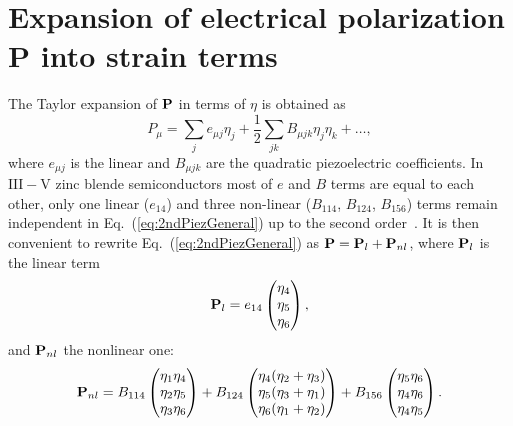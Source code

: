 
\newpage 





\section{Expansion of electrical polarization $\mathbf{P}$ into strain terms}

The Taylor expansion of ${\bf P}$ in terms of $\eta$ is obtained as
%
\begin{equation}
\label{eq:2ndPiezGeneral}
P_{\mu}=\sum_je_{\mu j}\eta_j+\frac{1}{2}\sum_{jk}B_{\mu jk}\eta_j\eta_k+\dots,
\end{equation}
%
where $e_{\mu j}$ is the linear and $B_{\mu jk}$ are the quadratic piezoelectric coefficients. In $\mathrm{III-V}$ zinc blende semiconductors most of $e$ and $B$ terms are equal to each other, only one linear ($e_{14}$) and three non-linear ($B_{114}$, $B_{124}$, $B_{156}$) terms remain independent in Eq.~(\ref{eq:2ndPiezGeneral}) up to the second order~\cite{Beya-Wakata2011}. It is then convenient to rewrite Eq.~(\ref{eq:2ndPiezGeneral}) as ${\bf P}={\bf P}_{l}+{\bf P}_{nl}$, where ${\bf P}_{l}$ is the linear term
%
%
\begin{equation}
\label{eq:1stPiez}
{\bf P}_{l}=e_{14}\begin{pmatrix}\eta_4\\\eta_5\\\eta_6\end{pmatrix},
\end{equation}
%
and ${\bf P}_{nl}$ the nonlinear one:
%
\begin{equation}
\label{eq:2ndPiez}
{\bf P}_{nl}=B_{114}\begin{pmatrix}\eta_1\eta_4\\\eta_2\eta_5\\\eta_3\eta_6\end{pmatrix}+
B_{124}\begin{pmatrix}\eta_4(\eta_2+\eta_3)\\\eta_5(\eta_3+\eta_1)\\\eta_6(\eta_1+\eta_2)\end{pmatrix}+
B_{156}\begin{pmatrix}\eta_5\eta_6\\\eta_4\eta_6\\\eta_4\eta_5\end{pmatrix}.
\end{equation}
